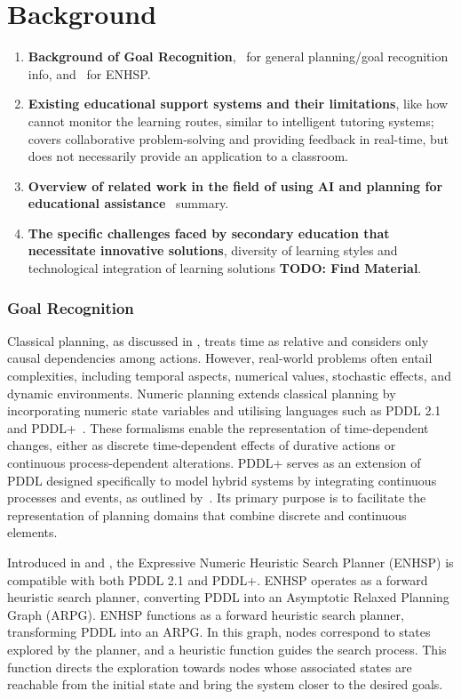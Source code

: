 \section{Background}
\begin{enumerate}
    \item \textbf{Background of Goal Recognition},~\citet{meneguzzi2021survey} for general planning/goal recognition info, and~\citet{Scala2016,ScalaHaslum2016} for ENHSP.
    \item \textbf{Existing educational support systems and their limitations}, like how~\citet{Garrido2009} cannot monitor the learning routes, similar to intelligent tutoring systems;~\citet{Rojas2022} covers collaborative problem-solving and providing feedback in real-time, but does not necessarily provide an application to a classroom.
    \item \textbf{Overview of related work in the field of using AI and planning for educational assistance}~\cite{Castillo2009} summary.
    \item \textbf{The specific challenges faced by secondary education that necessitate innovative solutions}, diversity of learning styles and technological integration of learning solutions \textbf{TODO: Find Material}.
\end{enumerate}

\subsubsection{Goal Recognition}
Classical planning, as discussed in \citet{Fox2003}, treats time as relative and considers only causal dependencies among actions. However, real-world problems often entail complexities, including temporal aspects, numerical values, stochastic effects, and dynamic environments. Numeric planning extends classical planning by incorporating numeric state variables and utilising languages such as PDDL 2.1~\cite{Fox2003} and PDDL+~\cite{Fox2006}. These formalisms enable the representation of time-dependent changes, either as discrete time-dependent effects of durative actions or continuous process-dependent alterations. PDDL+ serves as an extension of PDDL designed specifically to model hybrid systems by integrating continuous processes and events, as outlined by~\citet{Haslum2019}. Its primary purpose is to facilitate the representation of planning domains that combine discrete and continuous elements.

Introduced in \citet{Scala2016} and \citet{ScalaHaslum2016}, the Expressive Numeric Heuristic Search Planner (ENHSP) is compatible with both PDDL 2.1 and PDDL+. ENHSP operates as a forward heuristic search planner, converting PDDL into an Asymptotic Relaxed Planning Graph (ARPG). ENHSP functions as a forward heuristic search planner, transforming PDDL into an ARPG\@. In this graph, nodes correspond to states explored by the planner, and a heuristic function guides the search process. This function directs the exploration towards nodes whose associated states are reachable from the initial state and bring the system closer to the desired goals.

